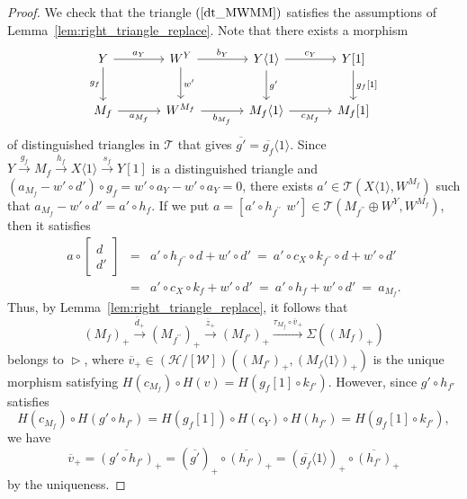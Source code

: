 \documentclass[a4paper,reqno,10pt]{amsart}
\theoremstyle{definition}
\theoremstyle{definition}
\theoremstyle{definition}
\theoremstyle{definition}
\theoremstyle{plain}
\newcommand{\CH}{\mathcal{H}}
\newcommand{\CT}{\mathcal{T}}
\newcommand{\CW}{\mathcal{W}}
\begin{document}
\begin{proof}
We check that the triangle $(\ref{dt_MWMM})$
satisfies the assumptions of Lemma~\ref{lem:right_triangle_replace}.
Note that there exists a morphism 
\[
\begin{tikzcd}[row sep=0.8cm, column sep=1.2cm]
Y \arrow{r}{a_Y}
\arrow{d}[swap]{g_f}
&
W^Y 
\arrow{r}{b_Y}
\arrow{d}{w'} 
&Y\langle1\rangle
\arrow{r}{c_Y}
\arrow{d}{g'}
&Y{[}1{]}
\arrow{d}{g_f{[}1{]}}
\\
M_f\arrow{r}[swap]{a_{M_f}}
&W^{M_f}\arrow{r}[swap]{b_{M_f}}
&M_f\langle1\rangle \arrow{r}[swap]{c_{M_f}}
&M_f{[}1{]}
\end{tikzcd}
\]
of distinguished triangles in $\CT$ that gives $\overline{g'}=\overline{g_f}\langle1\rangle$.
Since $Y\xrightarrow{g_f}M_f\xrightarrow{h_f}X\langle1\rangle\xrightarrow{s_f}Y[1]$ is a distinguished triangle and  
$(a_{M_f}-w'\circ d')\circ g_f=w'\circ a_Y-w'\circ a_Y=0$, 
there exists $a'\in\CT(X\langle1\rangle,W^{M_f})$ such that $a_{M_f}-w'\circ d'=a'\circ h_f$. If we put 
$a=[a'\circ h_{f^{\prime\prime}}\ \, w']\in\CT(M_{f^{\prime\prime}}\oplus W^Y,W^{M_f})$,
then it satisfies
\begin{eqnarray*}
a\circ \begin{bmatrix}d\\ d'\end{bmatrix}
&=&a'\circ h_{f^{\prime\prime}}\circ d+w'\circ d'
\ =\ a'\circ c_X\circ k_{f^{\prime\prime}}\circ d+w'\circ d'\\
&=&a'\circ c_X\circ k_f+w'\circ d'
\ =\ a'\circ h_f+w'\circ d'
\ =\ a_{M_f}.
\end{eqnarray*}
Thus, by Lemma~\ref{lem:right_triangle_replace}, it follows that
\[
(M_f)_+\xrightarrow{\overline{d}_+}(M_{f^{\prime\prime}})_+\xrightarrow{\overline{z}_+}
(M_{f'})_+\xrightarrow{\tau_{M_f}\circ \overline{v}_+}
\Sigma ((M_f)_+)
\]
belongs to $\vartriangleright$, where $\overline{v}_+\in(\CH/[\CW])((M_{f'})_+,(M_f\langle1\rangle)_+)$ is the unique morphism satisfying $H(c_{M_f})\circ H(v)=H(g_f[1]\circ k_{f'})$.
However, since $g'\circ h_{f'}$ satisfies
\[
H(c_{M_f})\circ H(g'\circ h_{f'})=H(g_f[1])\circ H(c_Y)\circ H(h_{f'})=H(g_f[1]\circ k_{f'}),
\]
we have
\begin{equation}\label{eq_ghv}
\overline{v}_+=\overline{(g'\circ h_{f'})}_+
=(\overline{g'})_+\circ \overline{(h_{f'})}_+
=(\overline{g_f}\langle1\rangle)_+\circ \overline{(h_{f'})}_+
\end{equation}
by the uniqueness.



\end{proof}
\end{document}
